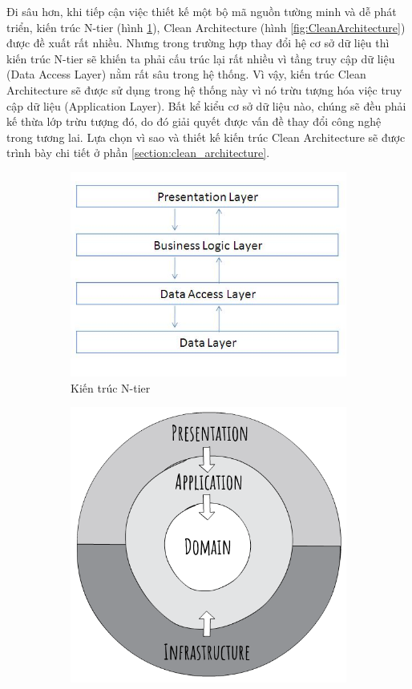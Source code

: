 \documentclass[../DoAn.tex]{subfiles}
\begin{document}
Đi sâu hơn, khi tiếp cận việc thiết kế một bộ mã nguồn tường minh và dễ phát triển, kiến trúc N-tier (hình \ref{fig:NtierArchitecture}), Clean Architecture (hình \ref{fig:CleanArchitecture}) được đề xuất rất nhiều. Nhưng trong trường hợp thay đổi hệ cơ sở dữ liệu thì kiến trúc N-tier sẽ khiến ta phải cấu trúc lại rất nhiều vì tầng truy cập dữ liệu (Data Access Layer) nằm rất sâu trong hệ thống. Vì vậy, kiến trúc Clean Architecture sẽ được sử dụng trong hệ thống này vì nó trừu tượng hóa việc truy cập dữ liệu (Application Layer). Bất kể kiểu cơ sở dữ liệu nào, chúng sẽ đều phải kế thừa lớp trừu tượng đó, do đó giải quyết được vấn đề thay đổi công nghệ trong tương lai. Lựa chọn vì sao và thiết kế kiến trúc Clean Architecture sẽ được trình bày chi tiết ở phần \ref{section:clean_architecture}.
\begin{figure}[H]
    \begin{subfigure}{0.49\textwidth}
        \centering
        \includegraphics[width=0.8\linewidth]{Hinhve/design/architecture/NtierArchitecture}
        \caption{Kiến trúc N-tier \cite{aspnetntiercodeproject}}
        \label{fig:NtierArchitecture}
    \end{subfigure}
    \begin{subfigure}{0.49\textwidth}
        \centering
        \includegraphics[width=0.6\linewidth]{Hinhve/design/architecture/CleanArchitecture}

\end{subfigure}
\end{figure}
\end{document}
